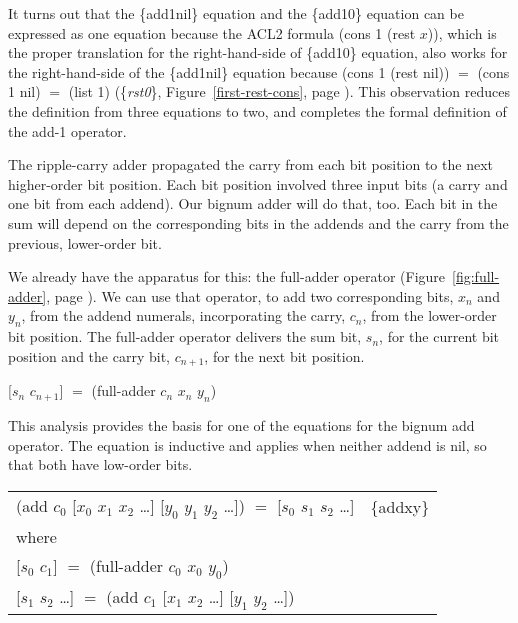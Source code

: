 It turns out that the \{add1nil\} equation
and the \{add10\} equation can be expressed as one equation because
the ACL2 formula \textsf{(cons 1 (rest $x$))}, which is the proper
translation for the right-hand-side of \{add10\} equation,
also works for the right-hand-side of the \{add1nil\} equation
because \textsf{(cons 1 (rest nil))} $=$ \textsf{(cons 1 nil)} $=$ \textsf{(list 1)}
(\{\emph{rst0}\}, Figure~\ref{first-rest-cons}, page \pageref{first-rest-cons}).
This observation reduces the definition from three equations to two,
and completes the formal definition of the \textsf{add-1} operator.

The ripple-carry adder propagated the carry from each bit position
to the next higher-order bit position.
Each bit position involved three input bits
(a carry and one bit from each addend).
Our bignum adder will do that, too.
Each bit in the sum will depend on the
corresponding bits in the addends and the carry from
the previous, lower-order bit.

We already have the apparatus for this: the \textsf{full-adder} operator
(Figure~\ref{fig:full-adder},  page \pageref{fig:full-adder}).
We can use that operator, to add two corresponding bits,
$x_n$ and $y_n$, from the addend numerals,
incorporating the carry, $c_n$, from the lower-order bit position.
The \textsf{full-adder} operator delivers the sum bit, $s_n$, for the current
bit position and the carry bit, $c_{n+1}$, for the next bit position.
\begin{center}
\textsf{[$s_n$ $c_{n+1}$]} $=$ \textsf{(full-adder $c_n$ $x_n$ $y_n$)}
\end{center}

This analysis provides the basis for
one of the equations for the bignum \textsf{add} operator.
The equation is inductive and applies
when neither addend is \textsf{nil},
so that both have low-order bits.

\begin{center}
\begin{tabular}{ll}
\textsf{(add $c_0$ [$x_0$ $x_1$ $x_2$ \dots ] [$y_0$ $y_1$ $y_2$ \dots ])} $=$ \textsf{[$s_0$ $s_1$ $s_2$ \dots ]}   & \{addxy\} \\
where & \\
\textsf{[$s_0$ $c_1$]} $=$ \textsf{(full-adder $c_0$ $x_0$ $y_0$)} & \\
\textsf{[$s_1$ $s_2$ \dots ]} $=$ \textsf{(add $c_1$ [$x_1$ $x_2$ \dots ] [$y_1$ $y_2$ \dots ])} & \\
\end{tabular}
\end{center}

